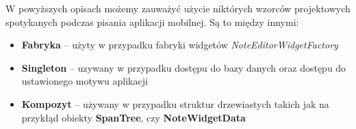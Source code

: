 W powyższych opisach możemy zauważyć użycie niktórych wzorców projektowych spotykanych podczas pisania aplikacji mobilnej. Są to między innymi:

\begin{itemize}
    \item \textbf{Fabryka} -- użyty w przypadku fabryki widgetów \textit{NoteEditorWidgetFactory}
    \item \textbf{Singleton} -- uzywany w przypadku dostępu do bazy danych oraz dostępu do ustawionego motywu aplikacji
    \item \textbf{Kompozyt} -- używany w przypadku struktur drzewiastych takich jak na przykłąd obiekty \textbf{SpanTree}, czy \textbf{NoteWidgetData}
\end{itemize}
